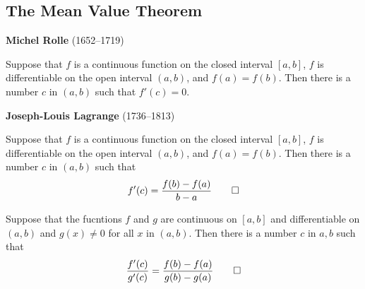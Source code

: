 \subsection{The Mean Value Theorem}
\textbf{Michel Rolle} (1652--1719)
\begin{theorem}
    Suppose that \(f\) is a continuous function on the closed interval \([a,b]\),
    \(f\) is differentiable on the open interval \((a,b)\), and \(f(a)=f(b)\).
    Then there is a number \(c\) in \((a,b)\) such that \(f'(c)=0\).
\end{theorem}
\textbf{Joseph-Louis Lagrange} (1736--1813)
\begin{theorem}
    Suppose that \(f\) is a continuous function on the closed interval \([a,b]\),
    \(f\) is differentiable on the open interval \((a,b)\), and \(f(a)=f(b)\).
    Then there is a number \(c\) in \((a,b)\) such that
    \[f'(c)=\frac{f(b)-f(a)}{b-a}\qedhere\]
\end{theorem}
\begin{theorem}
    Suppose that the fucntions \(f\) and \(g\) are continuous on \([a,b]\) and
    differentiable on \((a,b)\) and \(g(x)\neq 0\) for all \(x\) in \((a,b)\).
    Then there is a number \(c\) in \(a,b\) such that
    \[\frac{f'(c)}{g'(c)}=\frac{f(b)-f(a)}{g(b)-g(a)}\qedhere\]
\end{theorem}